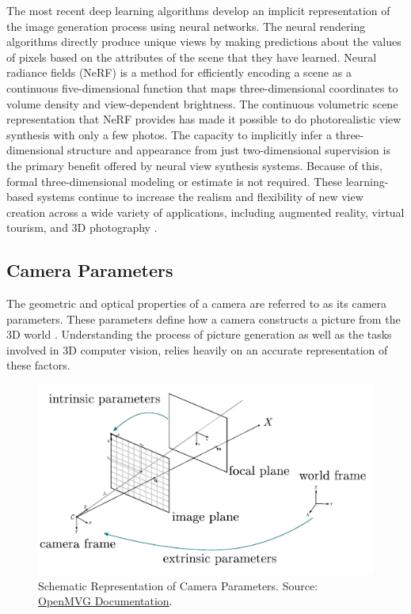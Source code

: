 The most recent deep learning algorithms develop an implicit representation of the image generation process using neural networks. The neural rendering algorithms directly produce unique views by making predictions about the values of pixels based on the attributes of the scene that they have learned. Neural radiance fields (NeRF) \cite{Mildenhall2020} is a method for efficiently encoding a scene as a continuous five-dimensional function that maps three-dimensional coordinates to volume density and view-dependent brightness\cite{Mildenhall2020}. The continuous volumetric scene representation that NeRF provides has made it possible to do photorealistic view synthesis with only a few photos.
\vspace{10pt}
The capacity to implicitly infer a three-dimensional structure and appearance from just two-dimensional supervision is the primary benefit offered by neural view synthesis systems. Because of this, formal three-dimensional modeling or estimate is not required. These learning-based systems continue to increase the realism and flexibility of new view creation across a wide variety of applications, including augmented reality, virtual tourism, and 3D photography \cite{Fang}.
\clearpage
\subsection{Camera Parameters}
The geometric and optical properties of a camera are referred to as its camera parameters. These parameters define how a camera constructs a picture from the 3D world \cite{Hartley2000}. Understanding the process of picture generation as well as the tasks involved in 3D computer vision, relies heavily on an accurate representation of these factors.


\vspace{20pt}

\begin{figure}[thbp]
\centering
\includegraphics[width=.7\textwidth]{img/Camera.png}
\caption[Schematic Representation of Camera Parameters]{Schematic Representation of Camera Parameters. Source: \href{https://openmvg.readthedocs.io/en/latest/openMVG/cameras/cameras/}{OpenMVG Documentation}.}\label{fig:camera-parameters}
\end{figure}




